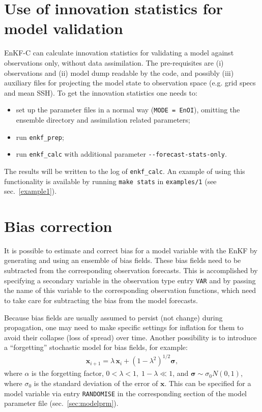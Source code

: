 \documentclass[11pt]{report}
\newcommand{\mb} {\mathbf}
\newcommand{\ms} {\boldsymbol}
\begin{document}
\section{Use of innovation statistics for model validation}

EnKF-C can calculate innovation statistics for validating a model against observations only, without data assimilation.
The pre-requisites are (i) observations and (ii) model dump readable by the code, and possibly (iii) auxiliary files for projecting the model state to observation space (e.g. grid specs and mean SSH).
To get the innovation statistics one needs to:
\begin{itemize}
\item set up the parameter files in a normal way (\verb|MODE = EnOI|), omitting the ensemble directory and assimilation related parameters;
\item run \verb|enkf_prep|;
\item run \verb|enkf_calc| with additional parameter \verb|--forecast-stats-only|.
\end{itemize}
The results will be written to the log of \verb|enkf_calc|. 
An example of using this functionality is available by running \verb|make stats| in \verb|examples/1| (see sec.~\ref{example1}).

\section{Bias correction}
\label{sec:bias}

It is possible to estimate and correct bias for a model variable with the EnKF by generating and using an ensemble of bias fields.
These bias fields need to be subtracted from the corresponding observation forecasts.
This is accomplished by specifying a secondary variable in the observation type entry \verb|VAR| and by passing the name of this variable to the corresponding observation functions, which need to take care for subtracting the bias from the model forecasts.

Because bias fields are usually assumed to persist (not change) during propagation, one may need to make specific settings for inflation for them to avoid their collapse (loss of spread) over time.
Another possibility is to introduce a ``forgetting'' stochastic model for bias fields, for example:
\begin{align*}
  \mb x_{i+1} = \lambda \, \mb x_i + (1 - \lambda^2)^{1/2} \ms \sigma,
\end{align*}
where $\alpha$ is the forgetting factor, $0 < \lambda < 1, \; 1 - \lambda \ll 1$, and $\ms \sigma \sim \sigma_0 N(0, 1)$, where $\sigma_0$ is the standard deviation of the error of $\mb x$.
This can be specified for a model variable via entry \verb|RANDOMISE| in the corresponding section of the model parameter file (sec.~\ref{sec:modelprm}).
\end{document}
